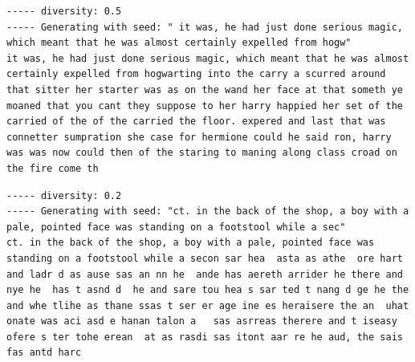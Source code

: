 \documentclass{article}[]
\begin{document}
\begin{lstlisting}[label=harry-gru-low-diverse, caption={script with GRU and with Harry Potter as input after 1 epoch and a diversity of 0.5}]
----- diversity: 0.5
----- Generating with seed: " it was, he had just done serious magic, which meant that he was almost certainly expelled from hogw"
it was, he had just done serious magic, which meant that he was almost certainly expelled from hogwarting into the carry a scurred around that sitter her starter was as on the wand her face at that someth ye moaned that you cant they suppose to her harry happied her set of the carried of the of the carried the floor. expered and last that was connetter sumpration she case for hermione could he said ron, harry was was now could then of the staring to maning along class croad on the fire come th
\end{lstlisting}


\begin{lstlisting}[label=harry-gru-gibberish, caption={script with GRU and with Harry Potter as input after 2 epoch and a diversity of 0.2 and a loss value of arround 2.4}]
----- diversity: 0.2
----- Generating with seed: "ct. in the back of the shop, a boy with a pale, pointed face was standing on a footstool while a sec"
ct. in the back of the shop, a boy with a pale, pointed face was standing on a footstool while a secon sar hea  asta as athe  ore hart and ladr d as ause sas an nn he  ande has aereth arrider he there and nye he  has t asnd d  he and sare tou hea s sar ted t nang d ge he the and whe tlihe as thane ssas t ser er age ine es heraisere the an  uhat onate was aci asd e hanan talon a   sas asrreas therere and t iseasy  ofere s ter tohe erean  at as rasdi sas itont aar re he aud, the sais fas antd harc
\end{lstlisting}

 

\end{document}
